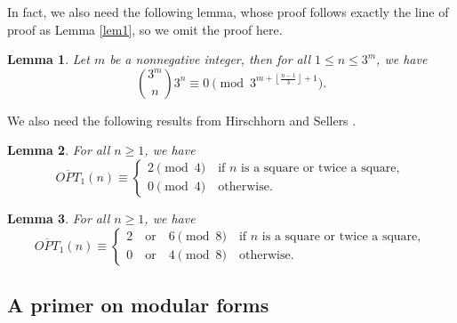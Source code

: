 \documentclass[12pt,reqno]{amsart}
\numberwithin{equation}{section}
\newcommand{\manjil}[1]{\textcolor{blue}{#1}}
\newcommand{\opt}{\overline{OPT}}
\newtheorem{lemma}{Lemma}[section]
\begin{document}
\noindent In fact, we also need the following lemma, whose proof follows exactly the line of proof as Lemma \ref{lem1}, so we omit the proof here.
\begin{lemma}\label{modified-ksv}
Let $m$ be a nonnegative integer, then for all $1\leq n\leq 3^m$, we have
\[
\binom{3^m}{n}3^n\equiv 0 \pmod{3^{m+\left\lfloor\frac{n-1}{3}\right\rfloor+1}}.
\]
\end{lemma}

\noindent We also need the following results from Hirschhorn and Sellers \cite[Theorems 1.1 and 1.2]{HSellers}.
\begin{lemma}\label{lem2}
    For all $n\geq 1$, we have
    \[
    \opt_1(n)\equiv \begin{cases}
        2\pmod 4 \quad \text{if $n$ is a square or twice a square},\\0\pmod 4\quad \text{otherwise}.
    \end{cases}
    \]
\end{lemma}
\begin{lemma}\label{lem3}
    For all $n\geq 1$, we have
    \[
    \opt_1(n)\equiv \begin{cases}
        2\quad \text{or}\quad 6\pmod 8 \quad \text{if $n$ is a square or twice a square},\\0\quad \text{or}\quad 4\pmod 8\quad \text{otherwise}.
    \end{cases}
    \]
\end{lemma}

\subsection{A primer on modular forms}\label{sec:modularforms}
\end{document}
